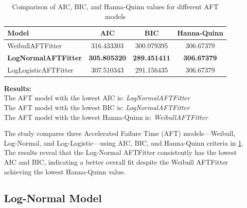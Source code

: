 \documentclass[doublespacing]{report} [12px]%
\begin{document}
\begin{table}[H]
    \centering
    \begin{tabular}{lccc}
        \hline
        Model & AIC & BIC & Hanna-Quinn \\
        \hline
        WeibullAFTFitter & 316.433303  & 300.079395& 306.67379\\
        \textbf{LogNormalAFTFitter}& \textbf{305.805320}& \textbf{289.451411}& \textbf{306.67379}\\
        LogLogisticAFTFitter & 307.510343& 291.156435& 306.67379\\
        \hline
    \end{tabular}
    \caption{Comparison of AIC, BIC, and Hanna-Quinn values for different AFT models}
    \label{tab:model_comparison}
\end{table}


\noindent
\textbf{Results:} \\
The AFT model with the lowest AIC is: \textit{LogNormalAFTFitter} \\
The AFT model with the lowest BIC is: \textit{LogNormalAFTFitter} \\
The AFT model with the lowest Hanna-Quinn is: \textit{WeibullAFTFitter}

The study compares three Accelerated Failure Time (AFT) models—Weibull, Log-Normal, and Log-Logistic—using AIC, BIC, and Hanna-Quinn criteria in \ref{tab:model_comparison}. The results reveal that the Log-Normal AFTFitter consistently has the lowest AIC and BIC, indicating a better overall fit despite the Weibull AFTFitter achieving the lowest Hanna-Quinn value.

\subsection{Log-Normal Model}
\end{document}
